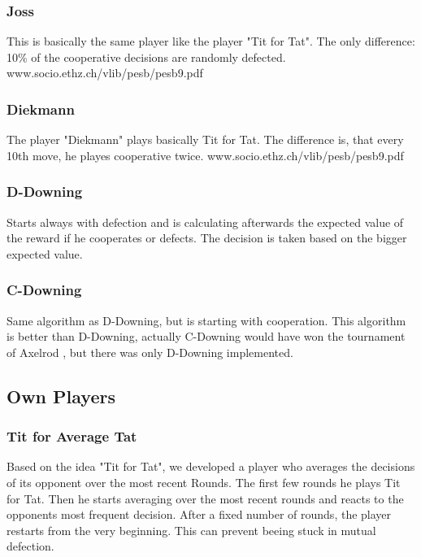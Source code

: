 \documentclass[11pt,twoside]{article}
\begin{document}
\subsubsection{Joss}
This is basically the same player like the player "Tit for Tat". The only difference: 10\% of the cooperative decisions are randomly defected.
www.socio.ethz.ch/vlib/pesb/pesb9.pdf

\subsubsection{Diekmann}
The player "Diekmann" plays basically Tit for Tat. The difference is, that every 10th move, he playes cooperative twice.
www.socio.ethz.ch/vlib/pesb/pesb9.pdf

\subsubsection{D-Downing}

Starts always with defection and is calculating afterwards the expected value of the reward if he cooperates or defects. The decision is taken based on the bigger expected value. 

\subsubsection{C-Downing}

Same algorithm as D-Downing, but is starting with cooperation. This algorithm is better than D-Downing, actually C-Downing would have won the tournament of Axelrod \cite{evolution of cooperation}, but there was only D-Downing implemented.

\subsection{Own Players}

\subsubsection{Tit for Average Tat}
Based on the idea "Tit for Tat", we developed a player who averages the decisions of its opponent over the most recent Rounds. The first few rounds he plays Tit for Tat. Then he starts averaging over the most recent rounds and reacts to the opponents most frequent decision. After a fixed number of rounds, the player restarts from the very beginning. This can prevent beeing stuck in mutual defection.
\end{document}
